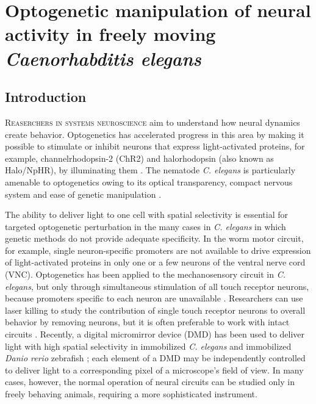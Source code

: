
\chapter{Optogenetic manipulation of neural activity in freely moving \textit{Caenorhabditis elegans}}


\section{Introduction}
\lettrine{R}{easerchers in systems neuroscience} aim to understand how neural dynamics create behavior. Optogenetics has accelerated progress in this area by making it possible to stimulate or inhibit neurons that express light-activated proteins, for example, channelrhodopsin-2 (ChR2) and halorhodopsin (also known as Halo/NpHR), by illuminating them \citep{nagel_channelrhodopsin-2_2003, boyden_millisecond-timescale_2005, zhang_channelrhodopsin-2_2006, han_multiple-color_2007,szobota_remote_2007,zhang_multimodal_2007,chow_high-performance_2010}. 
The nematode \textit{C. elegans} is particularly amenable to optogenetics owing to its optical transparency, compact nervous system and ease of genetic manipulation \citep{nagel_light_2005, liewald_optogenetic_2008, guo_optical_2009,stirman_high-throughput_2010}.

The ability to deliver light to one cell with spatial selectivity is essential for targeted optogenetic perturbation in the many cases in \textit{C. elegans} in which genetic methods do not provide adequate specificity. In the worm motor circuit, for example, single neuron-specific promoters are not available to drive expression of light-activated proteins in only one or a few neurons of the ventral nerve cord (VNC).
Optogenetics has been applied to the mechanosensory circuit in \textit{C. elegans}, but only through simultaneous stimulation of all touch receptor neurons, because promoters specific to each neuron are unavailable \citep{nagel_channelrhodopsin-2_2003}. 
Researchers can use laser killing to study the contribution of single touch receptor neurons to overall behavior by removing neurons, but it is often preferable to work with intact circuits \citep{chalfie_neural_1985, wicks_dynamic_1996, kitamura_contribution_2001}.
Recently, a digital micromirror device (DMD) has been used to deliver light with high spatial selectivity in immobilized \textit{C. elegans} and immobilized \textit{Danio rerio} zebrafish \citep{wyart_optogenetic_2009}; each element of a DMD may be independently controlled to deliver light to a corresponding pixel of a microscope's field of view. 
In many cases, however, the normal operation of neural circuits can be studied only in freely behaving animals, requiring a more sophisticated instrument.

